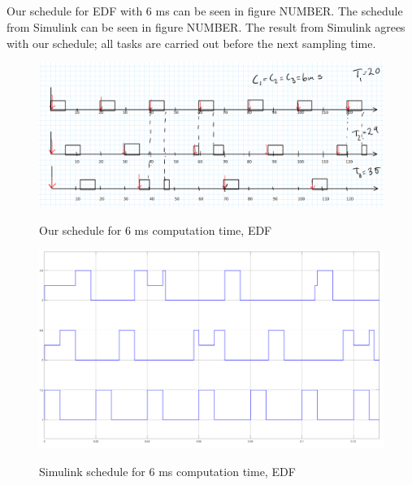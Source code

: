 \documentclass[12pt,a4paper]{article}
\begin{document}
\subsection{} 
Our schedule for EDF with 6 ms can be seen in figure NUMBER. The schedule from Simulink can be seen in figure NUMBER. The result from Simulink agrees with our schedule; all tasks are carried out before the next sampling time.
\begin{center}
	\begin{figure}[H]
      \centering
	\includegraphics[scale=0.5]{ex641.png}
	\label{fig:ex641}
	\caption{Our schedule for 6 ms computation time, EDF}
	\end{figure}
\end{center}
\begin{center}
	\begin{figure}[H]
      \centering
	\includegraphics[scale=0.2]{ex642.png}
	\label{fig:ex642}
	\caption{Simulink schedule for 6 ms computation time, EDF}
	\end{figure}
\end{center}
\end{document}
